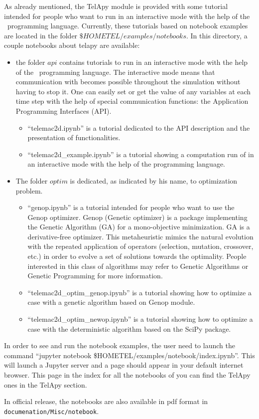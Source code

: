 As already mentioned, the TelApy module is provided with some tutorial intended
for people who want to run  in an interactive mode with the help of
the \python\ programming language. Currently, these tutorials based on notebook
examples are located in the folder
$\$HOMETEL/examples/notebooks$. In this directory, a couple notebooks
about telapy are available:

\begin{itemize}
\item the folder $api$ contains tutorials to run  in an interactive
  mode with the help of the \python\ programming language. The interactive mode
  means that communication with  becomes possible throughout the
  simulation without having to stop it. One can easily set or get the value of
  any variables at each time step with the help of special communication
  functions: the Application Programming Interfaces (API).
  \begin{itemize}
  \item ``telemac2d.ipynb'' is a tutorial dedicated to the API description and
    the presentation of  \python{} functionalities.
   \item ``telemac2d\_example.ipynb'' is a tutorial showing a computation run of
      in an interactive mode with the help of the \python{} programming
     language.
  \end{itemize}
\item  The folder $optim$ is dedicated, as indicated by his name, to
  optimization problem.
  \begin{itemize}
  \item ``genop.ipynb'' is a tutorial intended for people who want to use the
    Genop optimizer. Genop (Genetic optimizer) is a \python{} package implementing
    the Genetic Algorithm (GA) for a mono-objective minimization. GA is a
    derivative-free optimizer. This metaheuristic mimics the natural evolution
    with the repeated application of operators (selection, mutation, crossover,
    etc.) in order to evolve a set of solutions towards the optimality. People
    interested in this class of algorithms may refer to Genetic Algorithms or
    Genetic Programming for more information.
  \item ``telemac2d\_optim\_genop.ipynb'' is a tutorial showing how to optimize a
     case with a genetic algorithm based on Genop \python{} module.
    \item ``telemac2d\_optim\_newop.ipynb'' is a tutorial showing how to optimize
      a  case with the deterministic algorithm based on the SciPy
      package.
  \end{itemize}
\end{itemize}

In order to see and run the notebook examples, the user need to launch the
command ``jupyter notebook \$HOMETEL/examples/notebook/index.ipynb''. This will
launch a Jupyter server and a page should appear in your default internet
browser. This page in the index for all the notebooks of \telemacsystem{} you can find
the TelApy ones in the TelApy section.

In official release, the notebooks are also available in pdf format in
\verb!documenation/Misc/notebook!.
